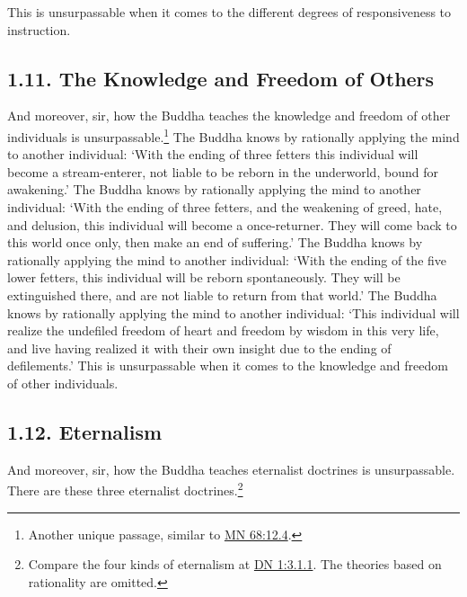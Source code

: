 \documentclass[12pt,openany]{book}%
\begin{document}
This is unsurpassable when it comes to the different degrees of responsiveness to instruction. 

\subsection*{1.11. The Knowledge and Freedom of Others }

And moreover, sir, how the Buddha teaches the knowledge and freedom of other individuals is unsurpassable.\footnote{Another unique passage, similar to \href{https://suttacentral.net/mn68/en/sujato\#12.4}{MN 68:12.4}. } The Buddha knows by rationally applying the mind to another individual: ‘With the ending of three fetters this individual will become a stream-enterer, not liable to be reborn in the underworld, bound for awakening.’ The Buddha knows by rationally applying the mind to another individual: ‘With the ending of three fetters, and the weakening of greed, hate, and delusion, this individual will become a once-returner. They will come back to this world once only, then make an end of suffering.’ The Buddha knows by rationally applying the mind to another individual: ‘With the ending of the five lower fetters, this individual will be reborn spontaneously. They will be extinguished there, and are not liable to return from that world.’ The Buddha knows by rationally applying the mind to another individual: ‘This individual will realize the undefiled freedom of heart and freedom by wisdom in this very life, and live having realized it with their own insight due to the ending of defilements.’ This is unsurpassable when it comes to the knowledge and freedom of other individuals. 

\subsection*{1.12. Eternalism }

And moreover, sir, how the Buddha teaches eternalist doctrines is unsurpassable. There are these three eternalist doctrines.\footnote{Compare the four kinds of eternalism at \href{https://suttacentral.net/dn1/en/sujato\#3.1.1}{DN 1:3.1.1}. The theories based on rationality are omitted. } 
\end{document}
